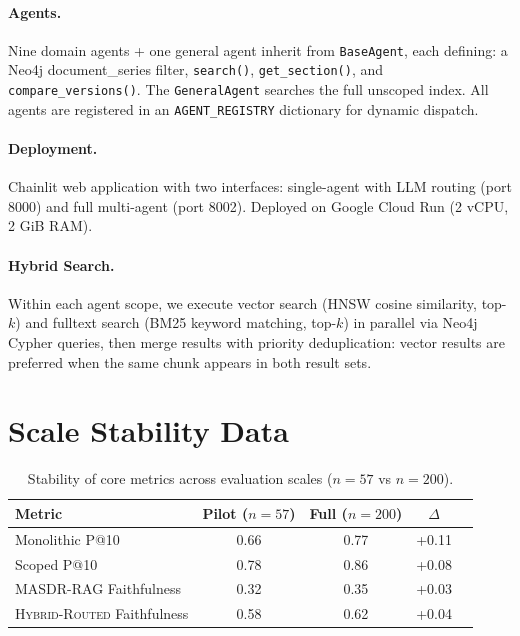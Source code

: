 \documentclass{article}
\newcommand{\systemname}{\textsc{MASDR-RAG}}
\newcommand{\hybridname}{\textsc{Hybrid-Routed}}
\begin{document}
\paragraph{Agents.} Nine domain agents + one general agent inherit from \texttt{BaseAgent}, each defining: a Neo4j document\_series filter, \texttt{search()}, \texttt{get\_section()}, and \texttt{compare\_versions()}. The \texttt{GeneralAgent} searches the full unscoped index. All agents are registered in an \texttt{AGENT\_REGISTRY} dictionary for dynamic dispatch.

\paragraph{Deployment.} Chainlit web application with two interfaces: single-agent with LLM routing (port 8000) and full multi-agent (port 8002). Deployed on Google Cloud Run (2 vCPU, 2 GiB RAM).

\paragraph{Hybrid Search.} Within each agent scope, we execute vector search (HNSW cosine similarity, top-$k$) and fulltext search (BM25 keyword matching, top-$k$) in parallel via Neo4j Cypher queries, then merge results with priority deduplication: vector results are preferred when the same chunk appears in both result sets.




\section{Scale Stability Data}
\label{app:ablation_scale}

\begin{table}[H]
\centering
\small
\begin{tabular}{lcccc}
\toprule
\textbf{Metric} & \textbf{Pilot ($n=57$)} & \textbf{Full ($n=200$)} & \textbf{$\Delta$} \\
\midrule
Monolithic P@10 & 0.66 & 0.77 & +0.11 \\
Scoped P@10 & 0.78 & 0.86 & +0.08 \\
\systemname{} Faithfulness & 0.32 & 0.35 & +0.03 \\
\hybridname{} Faithfulness & 0.58 & 0.62 & +0.04 \\
\bottomrule
\end{tabular}
\caption{Stability of core metrics across evaluation scales ($n=57$ vs $n=200$).}
\end{table}
\end{document}
